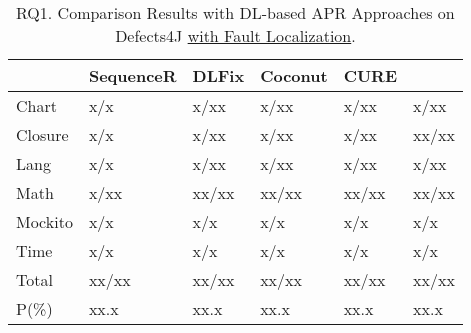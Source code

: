 \begin{table}[t]
  \caption{RQ1. Comparison Results with DL-based APR Approaches on Defects4J \underline {with Fault Localization}.}
  \vspace{-6pt}
  {\small
			\begin{center}
				\renewcommand{\arraystretch}{1}
				\begin{tabular}{p{0.9cm}<{\centering}|p{1.4cm}<{\centering}|p{1cm}<{\centering}|p{1cm}<{\centering}|p{1cm}<{\centering}|p{1cm}<{\centering}}
					
					\hline
					&\textbf{SequenceR}&\textbf{DLFix}& \textbf{Coconut}&\textbf{CURE}&\textbf{\tool}\\
					\hline
					Chart  & x/x   & x/xx  & x/xx  & x/xx   & x/xx\\
					Closure& x/x   & x/xx  & x/xx  & x/xx   & xx/xx\\
					Lang   & x/x   & x/xx  & x/xx  & x/xx   & x/xx\\
					Math    & x/xx  & xx/xx & xx/xx & xx/xx  & xx/xx\\
					Mockito & x/x   & x/x   & x/x   & x/x    & x/x\\
					Time    & x/x   & x/x   & x/x   & x/x    & x/x\\
					\hline
					Total   & xx/xx & xx/xx & xx/xx & xx/xx  & xx/xx\\
					\hline
					P(\%)  & xx.x  & xx.x  & xx.x  & xx.x   & xx.x\\
					\hline
				\end{tabular}
				\label{RQ1_defects4J_with_FL}
			\end{center}
                }
		\end{table}

















